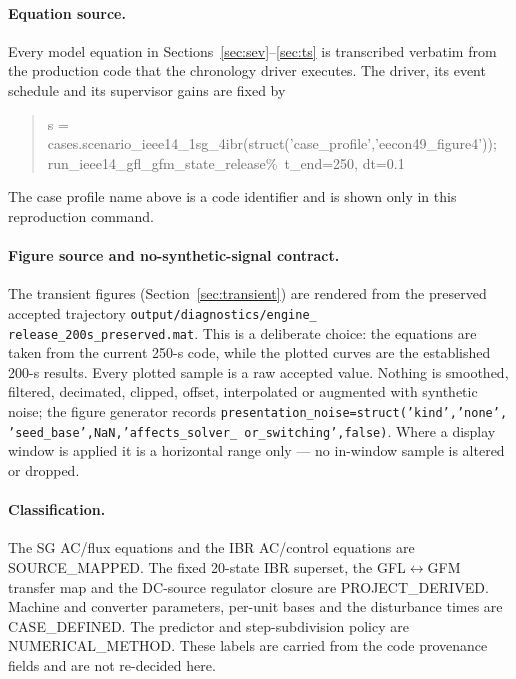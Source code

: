\documentclass[12pt,a4paper]{article}
\begin{document}
\paragraph{Equation source.}
Every model equation in Sections~\ref{sec:sev}--\ref{sec:ts} is transcribed
verbatim from the production code that the chronology driver executes. The
driver, its event schedule and its supervisor gains are fixed by
\begin{quote}\footnotesize\ttfamily\raggedright
s = cases.scenario\_ieee14\_1sg\_4ibr(\allowbreak struct('case\_profile',\allowbreak 'eecon49\_figure4'));\\
run\_ieee14\_gfl\_gfm\_state\_release\quad \%\ t\_end=250, dt=0.1
\end{quote}
The case profile name above is a code identifier and is shown only in this
reproduction command.

\paragraph{Figure source and no-synthetic-signal contract.}
\begin{sloppypar}
The transient figures (Section~\ref{sec:transient}) are rendered from the
preserved accepted trajectory
\texttt{output/\allowbreak diagnostics/\allowbreak engine\_\allowbreak
release\_\allowbreak 200s\_\allowbreak preserved.mat}. This is a
deliberate choice: the equations are taken from the current 250-s code, while
the plotted curves are the established 200-s results. Every plotted sample is a
raw accepted value. Nothing is smoothed, filtered, decimated, clipped, offset,
interpolated or augmented with synthetic noise; the figure generator records
\texttt{presentation\_\allowbreak noise=struct('kind',\allowbreak 'none',\allowbreak
'seed\_\allowbreak base',NaN,\allowbreak 'affects\_\allowbreak solver\_\allowbreak
or\_\allowbreak switching',false)}. Where a display
window is applied it is a horizontal range only --- no in-window sample is
altered or dropped.
\end{sloppypar}

\paragraph{Classification.}
\begin{sloppypar}
The SG AC/flux equations and the IBR AC/control equations are
\textsf{SOURCE\_\allowbreak MAPPED}. The fixed 20-state IBR superset, the
GFL$\leftrightarrow$GFM transfer map and the DC-source regulator closure are
\textsf{PROJECT\_\allowbreak DERIVED}.
Machine and converter parameters, per-unit bases and the disturbance times are
\textsf{CASE\_\allowbreak DEFINED}. The predictor and step-subdivision policy are
\textsf{NUMERICAL\_\allowbreak METHOD}. These labels are carried from the code
provenance fields and are not re-decided here.
\end{sloppypar}
\end{document}
